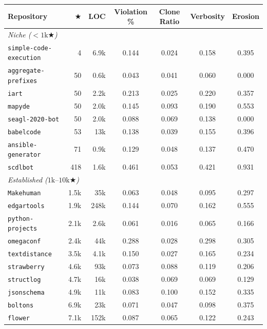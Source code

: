 \begin{table}[h]
    \centering
    \small
    \begin{tabular}{lrrcccc}
        \toprule
        Repository & $\bigstar$ & LOC & Violation \% & Clone Ratio & Verbosity & Erosion \\
        \midrule
        \multicolumn{7}{l}{\textit{Niche ($< 1\text{k}\bigstar$)}} \\
        \texttt{simple-code-execution} & 4 & 6.9k & 0.144 & 0.024 & 0.158 & 0.395 \\
        \texttt{aggregate-prefixes} & 50 & 0.6k & 0.043 & 0.041 & 0.060 & 0.000 \\
        \texttt{iart} & 50 & 2.2k & 0.213 & 0.025 & 0.220 & 0.357 \\
        \texttt{mapyde} & 50 & 2.0k & 0.145 & 0.093 & 0.190 & 0.553 \\
        \texttt{seagl-2020-bot} & 50 & 2.0k & 0.088 & 0.069 & 0.138 & 0.000 \\
        \texttt{babelcode} & 53 & 13k & 0.138 & 0.039 & 0.155 & 0.396 \\
        \texttt{ansible-generator} & 71 & 0.9k & 0.129 & 0.048 & 0.137 & 0.470 \\
        \texttt{scdlbot} & 418 & 1.6k & 0.461 & 0.053 & 0.421 & 0.931 \\
        \midrule
        \multicolumn{7}{l}{\textit{Established ($1\text{k}\text{--}10\text{k}\bigstar$)}} \\
        \texttt{Makehuman} & 1.5k & 35k & 0.063 & 0.048 & 0.095 & 0.297 \\
        \texttt{edgartools} & 1.9k & 248k & 0.144 & 0.070 & 0.162 & 0.555 \\
        \texttt{python-projects} & 2.1k & 2.6k & 0.061 & 0.016 & 0.065 & 0.166 \\
        \texttt{omegaconf} & 2.4k & 44k & 0.288 & 0.028 & 0.298 & 0.305 \\
        \texttt{textdistance} & 3.5k & 4.1k & 0.150 & 0.027 & 0.165 & 0.234 \\
        \texttt{strawberry} & 4.6k & 93k & 0.073 & 0.088 & 0.119 & 0.206 \\
        \texttt{structlog} & 4.7k & 16k & 0.038 & 0.069 & 0.069 & 0.129 \\
        \texttt{jsonschema} & 4.9k & 11k & 0.083 & 0.100 & 0.152 & 0.335 \\
        \texttt{boltons} & 6.9k & 23k & 0.071 & 0.047 & 0.098 & 0.375 \\
        \texttt{flower} & 7.1k & 152k & 0.087 & 0.065 & 0.122 & 0.243 \\

\end{tabular}
\end{table}
